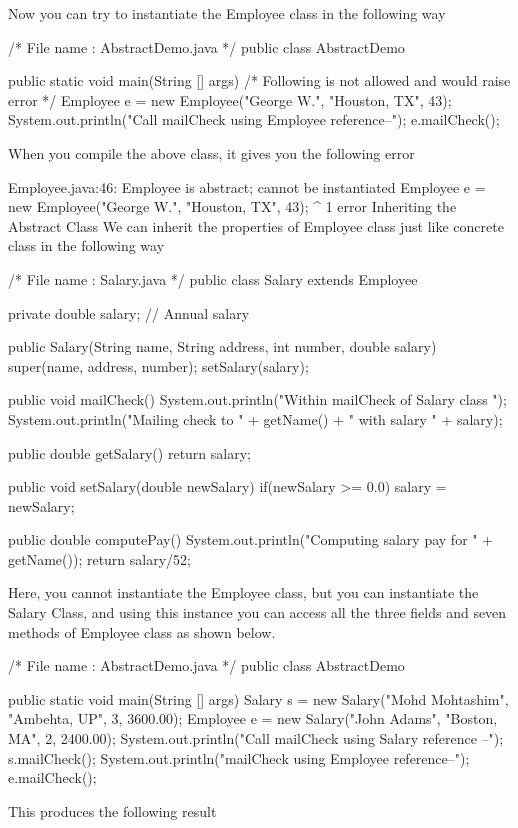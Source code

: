 Now you can try to instantiate the Employee class in the following way

/* File name : AbstractDemo.java */
public class AbstractDemo {

   public static void main(String [] args) {
      /* Following is not allowed and would raise error */
      Employee e = new Employee("George W.", "Houston, TX", 43);
      System.out.println("\n Call mailCheck using Employee reference--");
      e.mailCheck();
   }
}
When you compile the above class, it gives you the following error

Employee.java:46: Employee is abstract; cannot be instantiated
      Employee e = new Employee("George W.", "Houston, TX", 43);
                   ^
1 error
Inheriting the Abstract Class
We can inherit the properties of Employee class just like concrete class in the following way

/* File name : Salary.java */
public class Salary extends Employee {
   private double salary;   // Annual salary

   public Salary(String name, String address, int number, double salary) {
      super(name, address, number);
      setSalary(salary);
   }

   public void mailCheck() {
      System.out.println("Within mailCheck of Salary class ");
      System.out.println("Mailing check to " + getName() + " with salary " + salary);
   }

   public double getSalary() {
      return salary;
   }

   public void setSalary(double newSalary) {
      if(newSalary >= 0.0) {
         salary = newSalary;
      }
   }

   public double computePay() {
      System.out.println("Computing salary pay for " + getName());
      return salary/52;
   }
}
Here, you cannot instantiate the Employee class, but you can instantiate the Salary Class, and using this instance you can access all the three fields and seven methods of Employee class as shown below.

/* File name : AbstractDemo.java */
public class AbstractDemo {

   public static void main(String [] args) {
      Salary s = new Salary("Mohd Mohtashim", "Ambehta, UP", 3, 3600.00);
      Employee e = new Salary("John Adams", "Boston, MA", 2, 2400.00);
      System.out.println("Call mailCheck using Salary reference --");
      s.mailCheck();
      System.out.println("\nCall mailCheck using Employee reference--");
      e.mailCheck();
   }
}
This produces the following result


